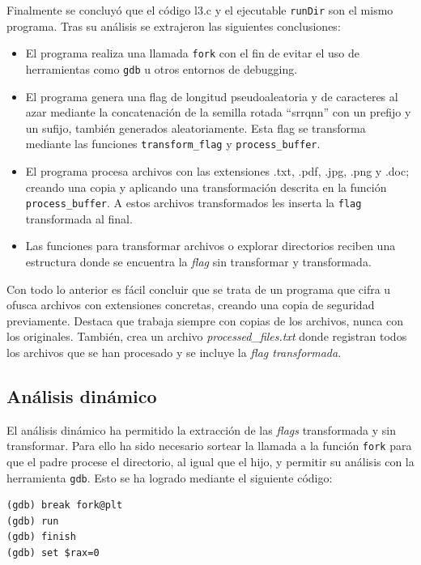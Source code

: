 \documentclass[]{article}
\begin{document}
Finalmente se concluyó que el código l3.c y el ejecutable \texttt{runDir} son el mismo programa. Tras su análisis se extrajeron las siguientes conclusiones:
\begin{itemize}
    \item El programa realiza una llamada \texttt{fork} con el fin de evitar el
    uso de herramientas como \texttt{gdb} u otros entornos de debugging.
    \item El programa genera una flag de longitud pseudoaleatoria y de
    caracteres al azar mediante la concatenación de la semilla rotada
    ``srrqnn'' con un prefijo y un sufijo, también generados aleatoriamente.
    Esta flag se transforma mediante las funciones \texttt{transform\_flag} y
    \texttt{process\_buffer}.
    \item El programa procesa archivos con las extensiones .txt, .pdf, .jpg,
    .png y .doc; creando una copia y aplicando una transformación descrita en
    la función \texttt{process\_buffer}. A estos archivos transformados les
    inserta la \texttt{flag} transformada al final.
    \item Las funciones para transformar archivos o explorar directorios
    reciben una estructura donde se encuentra la \textit{flag} sin transformar
    y transformada.
\end{itemize}

Con todo lo anterior es fácil concluir que se trata de un programa que cifra u
ofusca archivos con extensiones concretas, creando una copia de seguridad
previamente. Destaca que trabaja siempre con copias de los archivos, nunca con
los originales. También, crea un archivo \textit{processed\_files.txt} donde
registran todos los archivos que se han procesado y se incluye la \textit{flag
transformada}.

\subsection{Análisis dinámico}
\label{subsec:analisis-dinámico-1}

El análisis dinámico ha permitido la extracción de las \textit{flags}
transformada y sin transformar. Para ello ha sido necesario sortear la llamada
a la función \texttt{fork} para que el padre procese el directorio, al igual
que el hijo, y permitir su análisis con la herramienta \texttt{gdb}. Esto se ha
logrado mediante el siguiente código:

\newpage
\begin{lstlisting}[caption=Instrucciones en gdb para esquivar la llamada fork]
(gdb) break fork@plt
(gdb) run
(gdb) finish
(gdb) set $rax=0
\end{lstlisting}
\end{document}
